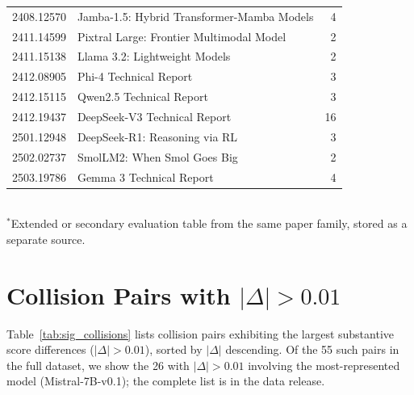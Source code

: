 \documentclass[11pt]{article}
\begin{document}
\begin{table}[t!]
\begin{tabular}{llr}
2408.12570 & Jamba-1.5: Hybrid Transformer-Mamba Models & 4 \\
2411.14599 & Pixtral Large: Frontier Multimodal Model & 2 \\
2411.15138 & Llama 3.2: Lightweight Models & 2 \\
2412.08905 & Phi-4 Technical Report & 3 \\
2412.15115 & Qwen2.5 Technical Report & 3 \\
2412.19437 & DeepSeek-V3 Technical Report & 16 \\
2501.12948 & DeepSeek-R1: Reasoning via RL & 3 \\
2502.02737 & SmolLM2: When Smol Goes Big & 2 \\
2503.19786 & Gemma 3 Technical Report & 4 \\
\bottomrule
\end{tabular}
\vspace{2pt}\\
\footnotesize $^*$Extended or secondary evaluation table from the same paper family, stored as a separate source.
\end{table}

\section{Collision Pairs with $|\Delta| > 0.01$}
\label{app:collisions}

Table~\ref{tab:sig_collisions} lists collision pairs exhibiting
the largest substantive score differences ($|\Delta| > 0.01$), sorted by
$|\Delta|$ descending.
Of the 55 such pairs in the full dataset, we show the 26 with
$|\Delta| > 0.01$ involving the most-represented model (Mistral-7B-v0.1);
the complete list is in the data release.
\end{document}
